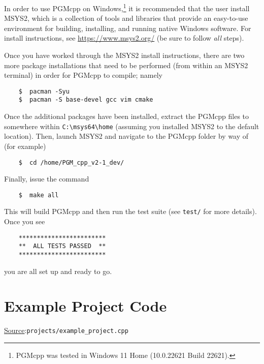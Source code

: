 \documentclass[12pt, letterpaper]{report}
\begin{document}
In order to use PGMcpp on Windows,\footnote{PGMcpp was tested in Windows 11 Home (10.0.22621 Build 22621).} it is recommended that the user install MSYS2, which is a collection of tools and libraries that provide an easy-to-use environment for building, installing, and running native Windows software. For install instructions, see \url{https://www.msys2.org/} (be sure to follow \textit{all} steps).\par
Once you have worked through the MSYS2 install instructions, there are two more package installations that need to be performed (from within an MSYS2 terminal) in order for PGMcpp to compile; namely

\begin{verbatim}
    $  pacman -Syu
    $  pacman -S base-devel gcc vim cmake
\end{verbatim}

Once the additional packages have been installed, extract the PGMcpp files to somewhere within \texttt{C:\textbackslash msys64\textbackslash home} (assuming you installed MSYS2 to the default location). Then, launch MSYS2 and navigate to the PGMcpp folder by way of (for example)

\begin{verbatim}
    $  cd /home/PGM_cpp_v2-1_dev/
\end{verbatim}

\noindent Finally, issue the command

\begin{verbatim}
    $  make all
\end{verbatim}

\noindent This will build PGMcpp and then run the test suite (see \texttt{test/} for more details). Once you see

\begin{verbatim}
    ************************
    **  ALL TESTS PASSED  **
    ************************
\end{verbatim}

\noindent you are all set up and ready to go.

\section{Example Project Code}

\begin{large}
\noindent\underline{Source}:\quad\texttt{projects/example\_project.cpp}\par
\end{large}
\vspace{5mm}
\end{document}
